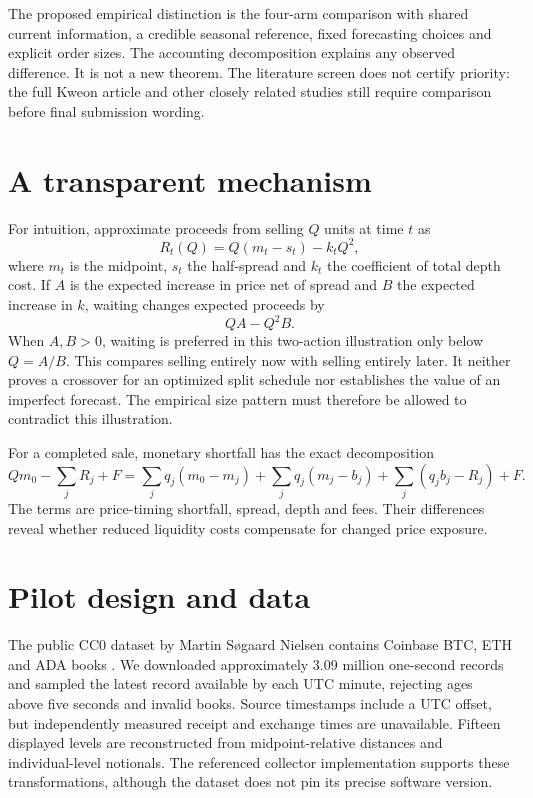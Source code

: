 \documentclass[10pt,a4paper]{article}
\begin{document}
The proposed empirical distinction is the four-arm comparison with shared current information, a credible seasonal reference, fixed forecasting choices and explicit order sizes. The accounting decomposition explains any observed difference. It is not a new theorem. The literature screen does not certify priority: the full Kweon article and other closely related studies still require comparison before final submission wording.

\section{A transparent mechanism}
For intuition, approximate proceeds from selling $Q$ units at time $t$ as
\[
 R_t(Q)=Q(m_t-s_t)-k_tQ^2,
\]
where $m_t$ is the midpoint, $s_t$ the half-spread and $k_t$ the coefficient of total depth cost. If $A$ is the expected increase in price net of spread and $B$ the expected increase in $k$, waiting changes expected proceeds by
\[
 QA-Q^2B.
\]
When $A,B>0$, waiting is preferred in this two-action illustration only below $Q=A/B$. This compares selling entirely now with selling entirely later. It neither proves a crossover for an optimized split schedule nor establishes the value of an imperfect forecast. The empirical size pattern must therefore be allowed to contradict this illustration.

For a completed sale, monetary shortfall has the exact decomposition
\[
 Qm_0-\sum_j R_j+F
 =\sum_jq_j(m_0-m_j)+\sum_jq_j(m_j-b_j)
   +\sum_j(q_jb_j-R_j)+F.
\]
The terms are price-timing shortfall, spread, depth and fees. Their differences reveal whether reduced liquidity costs compensate for changed price exposure.

\section{Pilot design and data}
The public CC0 dataset by Martin S\o gaard Nielsen contains Coinbase BTC, ETH and ADA books \cite{data}. We downloaded approximately 3.09 million one-second records and sampled the latest record available by each UTC minute, rejecting ages above five seconds and invalid books. Source timestamps include a UTC offset, but independently measured receipt and exchange times are unavailable. Fifteen displayed levels are reconstructed from midpoint-relative distances and individual-level notionals. The referenced collector implementation supports these transformations, although the dataset does not pin its precise software version.
\end{document}
